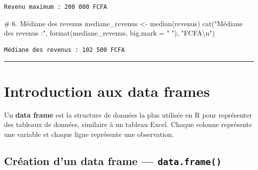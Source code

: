 \documentclass[
  french,
  11pt,
  a4paper,
]{article}
\newenvironment{Shaded}{}{}
\newcommand{\AttributeTok}[1]{\textcolor[rgb]{0.84,0.23,0.29}{#1}}
\newcommand{\CommentTok}[1]{\textcolor[rgb]{0.42,0.45,0.49}{#1}}
\newcommand{\FunctionTok}[1]{\textcolor[rgb]{0.44,0.26,0.76}{#1}}
\newcommand{\NormalTok}[1]{\textcolor[rgb]{0.14,0.16,0.18}{#1}}
\newcommand{\OtherTok}[1]{\textcolor[rgb]{0.44,0.26,0.76}{#1}}
\newcommand{\SpecialCharTok}[1]{\textcolor[rgb]{0.00,0.36,0.77}{#1}}
\newcommand{\StringTok}[1]{\textcolor[rgb]{0.01,0.18,0.38}{#1}}
\begin{document}
\begin{verbatim}
Revenu maximum : 200 000 FCFA
\end{verbatim}

\begin{Shaded}
\begin{Highlighting}[]
\CommentTok{\# 6. Médiane des revenus}
\NormalTok{mediane\_revenus }\OtherTok{\textless{}{-}} \FunctionTok{median}\NormalTok{(revenus)}
\FunctionTok{cat}\NormalTok{(}\StringTok{"Médiane des revenus :"}\NormalTok{, }\FunctionTok{format}\NormalTok{(mediane\_revenus, }\AttributeTok{big.mark =} \StringTok{" "}\NormalTok{), }\StringTok{"FCFA}\SpecialCharTok{\textbackslash{}n}\StringTok{"}\NormalTok{)}
\end{Highlighting}
\end{Shaded}

\begin{verbatim}
Médiane des revenus : 102 500 FCFA
\end{verbatim}

\begin{center}\rule{0.5\linewidth}{0.5pt}\end{center}

\section{Introduction aux data
frames}\label{introduction-aux-data-frames}

Un \textbf{data frame} est la structure de données la plus utilisée en R
pour représenter des tableaux de données, similaire à un tableau Excel.
Chaque colonne représente une variable et chaque ligne représente une
observation.

\subsection{\texorpdfstring{Création d'un data frame ---
\texttt{data.frame()}}{Création d'un data frame --- data.frame()}}\label{cruxe9ation-dun-data-frame-data.frame}
\end{document}
